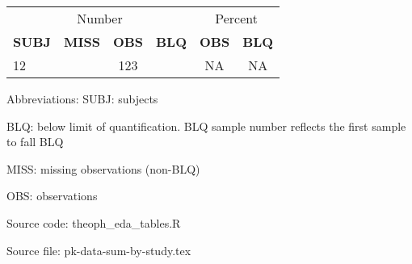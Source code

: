 \setlength{\tabcolsep}{5pt} 
\begin{threeparttable}
\renewcommand{\arraystretch}{1.3}
\begin{tabular}[h]{lccccc}
\hline
\multicolumn{4}{c}{Number} & \multicolumn{2}{c}{Percent} \\
\cmidrule(lr){1-4}
\cmidrule(lr){5-6}
\textbf{SUBJ} & \textbf{MISS} & \textbf{OBS} & \textbf{BLQ} & \textbf{OBS} & \textbf{BLQ} \\
\hline
12 &  & 123 &  & NA & NA \\
\hline
\end{tabular}
\begin{tablenotes}[flushleft]
\item Abbreviations: SUBJ: subjects
\item BLQ: below limit of quantification. BLQ sample number reflects the first sample to fall BLQ
\item MISS: missing observations (non-BLQ)
\item OBS: observations
\item Source code: theoph\_eda\_tables.R
\item Source file: pk-data-sum-by-study.tex
\end{tablenotes}
\end{threeparttable}
